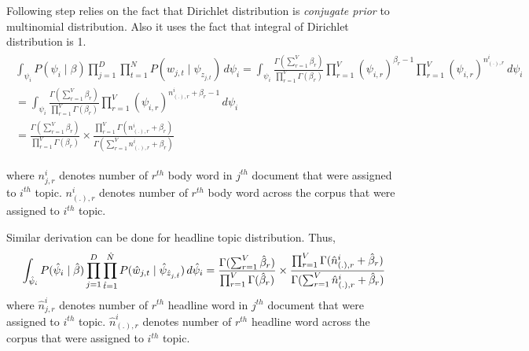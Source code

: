\documentclass[a4paper]{article}
\begin{document}
Following step relies on the fact that Dirichlet distribution is \textit{conjugate prior} to multinomial distribution. Also it uses the fact that integral of Dirichlet distribution is 1.
\begin{align*}
\begin{split}
\int_{\psi_{i}} P(\psi_{i} \mid \beta) \prod_{j=1}^{D} \prod_{t=1}^{N} P(w_{j,t} \mid \psi_{z_{j,t}}) \,d\psi_{i}
 = \int_{\psi_{i}} \frac{\Gamma(\sum_{r=1}^{V} \beta_{r})}{\prod_{r=1}^{V}\Gamma(\beta_{r})} \prod_{r=1}^{V} (\psi_{i,r})^{\beta_{r} -1} \prod_{r=1}^{V} (\psi_{i,r})^{n_{(.),r}^{i}}\,d\psi_{i}\\
  = \int_{\psi_{i}} \frac{\Gamma(\sum_{r=1}^{V} \beta_{r})}{\prod_{r=1}^{V}\Gamma(\beta_{r})} \prod_{r=1}^{V} (\psi_{i,r})^{n_{(.),r}^{i} + \beta_{r} -1} \,d\psi_{i}\\
 = \frac{\Gamma(\sum_{r=1}^{V} \beta_{r})}{\prod_{r=1}^{V}\Gamma(\beta_{r})} \times \frac{\prod_{r=1}^{V} \Gamma(n_{(.),r}^{i} + \beta_{r} )}{\Gamma(\sum_{r=1}^{V}n_{(.),r}^{i} + \beta_{r} )}
\end{split}
\end{align*}

where $n_{j,r}^{i}$ denotes number of $r^{th}$ body word in $j^{th}$ document that were assigned to $i^{th}$ topic.  $n_{(.),r}^{i}$ denotes number of $r^{th}$ body word across the corpus that were assigned to $i^{th}$ topic.

Similar derivation can be done for headline topic distribution. Thus,
\begin{displaymath}
\int_{\hat{\psi}_{i}} P(\hat{\psi}_{i} \mid \hat{\beta}) \prod_{j=1}^{D} \prod_{\hat{t}=1}^{\hat{N}} P(\hat{w}_{j,t} \mid \hat{\psi}_{\hat{z}_{j,\hat{t}}}) \,d\hat{\psi}_{i} \\
= \frac{\Gamma(\sum_{r=1}^{V} \hat{\beta}_{r})}{\prod_{r=1}^{V}\Gamma(\hat{\beta}_{r})} \times \frac{\prod_{r=1}^{V} \Gamma(\hat{n}_{(.),r}^{i} + \hat{\beta}_{r} )}{\Gamma(\sum_{r=1}^{V}\hat{n}_{(.),r}^{i} + \hat{\beta}_{r} )}
\end{displaymath}
where $\hat{n}_{j,r}^{i}$ denotes number of $r^{th}$ headline word in $j^{th}$ document that were assigned to $i^{th}$ topic.  $\hat{n}_{(.),r}^{i}$ denotes number of $r^{th}$ headline word across the corpus that were assigned to $i^{th}$ topic.
\end{document}
